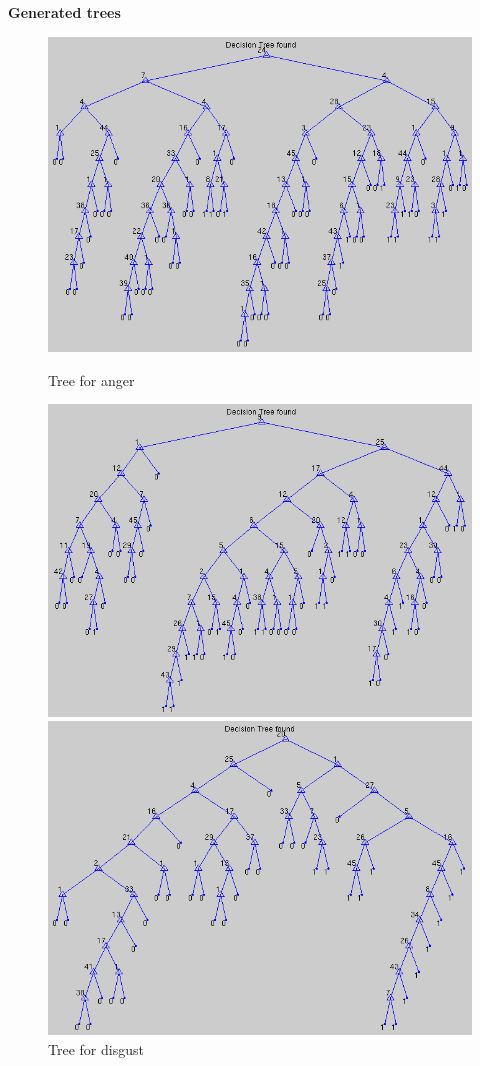 \documentclass[12pt]{article}
\begin{document}
{\bf Generated trees} \\
\begin{figure}[h]
  \includegraphics{report-images/tree1.png}
  \caption{Tree for anger}
\hfill
  \includegraphics{report-images/tree2.png}
  \caption{Tree for disgust}
\hfill
  \includegraphics{report-images/tree3.png}

\end{figure}
\end{document}
